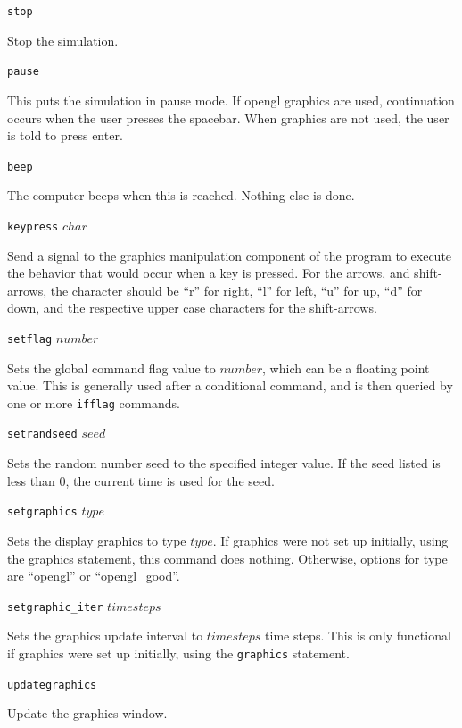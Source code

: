 \documentclass {scrbook}
\newcommand {\ttt} {\texttt}
\begin{document}
\begin{description}

\item{\ttt{stop}}

Stop the simulation.

\item{\ttt{pause}}

This puts the simulation in pause mode. If opengl graphics are used, continuation occurs when the user presses the spacebar. When graphics are not used, the user is told to press enter.

\item{\ttt{beep}}

The computer beeps when this is reached. Nothing else is done.

\item{\ttt{keypress} $char$}

Send a signal to the graphics manipulation component of the program to execute the behavior that would occur when a key is pressed. For the arrows, and shift-arrows, the character should be ``r'' for right, ``l'' for left, ``u'' for up, ``d'' for down, and the respective upper case characters for the shift-arrows.

\item{\ttt{setflag} $number$}

Sets the global command flag value to $number$, which can be a floating point value. This is generally used after a conditional command, and is then queried by one or more \ttt{ifflag} commands.

\item{\ttt{setrandseed} $seed$}

Sets the random number seed to the specified integer value. If the seed listed is less than 0, the current time is used for the seed.

\item{\ttt{setgraphics} $type$}

Sets the display graphics to type $type$. If graphics were not set up initially, using the graphics statement, this command does nothing. Otherwise, options for type are ``opengl'' or ``opengl\_good''.

\item{\ttt{setgraphic\_iter} $timesteps$}

Sets the graphics update interval to $timesteps$ time steps. This is only functional if graphics were set up initially, using the \ttt{graphics} statement.

\item{\ttt{updategraphics}}

Update the graphics window.

\end{description}
\end{document}
